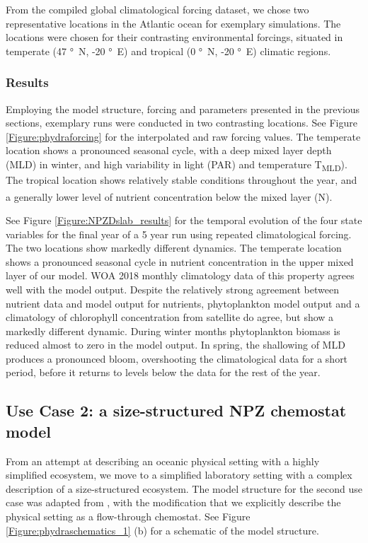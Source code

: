 \documentclass[journal abbreviations, manuscript]{copernicus}
\begin{document}
From the compiled global climatological forcing dataset, we chose two representative locations in the Atlantic ocean for exemplary simulations. The locations were chosen for their contrasting environmental forcings, situated in temperate (47 \unit{\degree N}, -20 \unit{\degree E}) and tropical (0 \unit{\degree N}, -20 \unit{\degree E}) climatic regions. 


\subsubsection{Results}
Employing the model structure, forcing and parameters presented in the previous sections, exemplary runs were conducted in two contrasting locations. 
See Figure \ref{Figure:phydraforcing} for the interpolated and raw forcing values. The temperate location shows a pronounced seasonal cycle, with a deep mixed layer depth (MLD) in winter, and high variability in light (PAR) and temperature \unit{T_{MLD}}). The tropical location shows relatively stable conditions throughout the year, and a generally lower level of nutrient concentration below the mixed layer (\unit{N^\emptyset}).

See Figure \ref{Figure:NPZDslab_results} for the temporal evolution of the four state variables for the final year of a 5 year run using repeated climatological forcing. 
The two locations show markedly different dynamics. The temperate location shows a pronounced seasonal cycle in nutrient concentration in the upper mixed layer of our model. WOA 2018 monthly climatology data of this property agrees well with the model output. Despite the relatively strong agreement between nutrient data and model output for nutrients, phytoplankton model output and a climatology of chlorophyll concentration from satellite do agree, but show a markedly different dynamic. During winter months phytoplankton biomass is reduced almost to zero in the model output. In spring, the shallowing of MLD produces a pronounced bloom, overshooting the climatological data for a short period, before it returns to levels below the data for the rest of the year. 





\subsection{Use Case 2: a size-structured NPZ chemostat model}
From an attempt at describing an oceanic physical setting with a highly simplified ecosystem, we move to a simplified laboratory setting with a complex description of a size-structured ecosystem. The model structure for the second use case was adapted from \cite{Banas2011b}, with the modification that we explicitly describe the physical setting as a flow-through chemostat. See Figure \ref{Figure:phydraschematics_1} (b) for a schematic of the model structure. 
\end{document}
